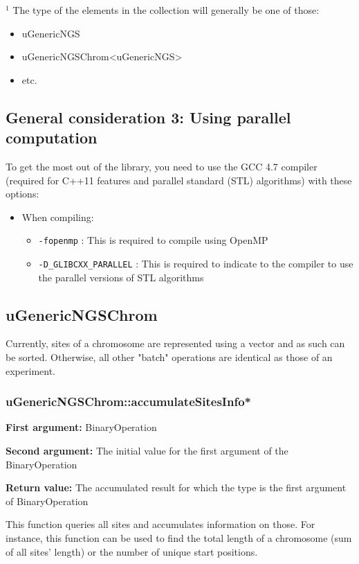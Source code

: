 \documentclass[letterpaper,10pt]{article}
\begin{document}
\bigskip
\noindent$^1$ The type of the elements in the collection will generally be one of those:
\begin{itemize}
 \item uGenericNGS
 \item uGenericNGSChrom<uGenericNGS>
 \item etc.
\end{itemize}

\subsection{General consideration 3: Using parallel computation}
To get the most out of the library, you need to use the GCC 4.7 compiler (required for C++11 features and parallel standard (STL) algorithms) with these options:
\begin{itemize}
 \item When compiling:
  \begin{itemize}
   \item \verb+-fopenmp+ : This is required to compile using OpenMP
   \item \verb+-D_GLIBCXX_PARALLEL+ : This is required to indicate to the compiler to use the parallel versions of STL algorithms
  \end{itemize}
\end{itemize}


\subsection{uGenericNGSChrom}
Currently, sites of a chromosome are represented using a vector and as such can be sorted. Otherwise, all other "batch" operations are identical as those of an experiment.
\subsubsection{uGenericNGSChrom::accumulateSitesInfo*}
\textbf{First argument:} BinaryOperation

\noindent{}\textbf{Second argument:} The initial value for the first argument of the BinaryOperation

\noindent{}\textbf{Return value:} The accumulated result for which the type is the first argument of BinaryOperation

\bigskip
\noindent{}This function queries all sites and accumulates information on those. For instance, this function can be used to find the total length of a chromosome (sum of all sites' length) or the number of unique start positions.
\end{document}
